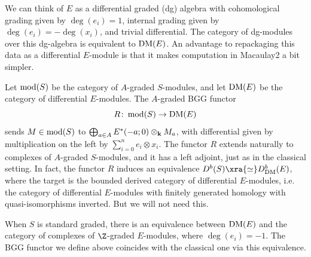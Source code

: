 \documentclass{amsart}
\begin{document}
\begin{remark}
We can think of $E$ as a differential graded (dg) algebra with cohomological grading given by $\deg(e_i) = 1$, internal grading given by $\deg(e_i) = -\deg(x_i)$, and trivial differential. The category of dg-modules over this dg-algebra is equivalent to $\operatorname{DM}(E)$. An advantage to repackaging this data as a differential $E$-module is that it makes computation in Macaulay2 a bit simpler.
\end{remark}

Let $\operatorname{mod}(S)$ be the category of $A$-graded $S$-modules, and let $\operatorname{DM}(E)$ be the category of differential $E$-modules. The $A$-graded BGG functor
$$
R \colon \operatorname{mod}(S) \to \operatorname{DM}(E)
$$
sends $M \in \operatorname{mod}(S)$ to $\bigoplus_{a \in A} E^*(-a;0) \otimes_{\mathbf{k}} M_a$, with differential given by multiplication on the left by $\sum_{i = 0}^n e_i \otimes x_i$. The functor $R$ extends naturally to complexes of $A$-graded $S$-modules, and it has a left adjoint, just as in the classical setting. In fact, the functor $R$ induces an equivalence $D^b(S) \xra{\simeq} D^b_{\DM}(E)$, where the target is the bounded derived category of differential $E$-modules, i.e. the category of differential $E$-modules with finitely generated homology with quasi-isomorphisms inverted. But we will not need this.

\begin{remark}
\label{rem:stdm}
When $S$ is standard graded, there is an equivalence between $\operatorname{DM}(E)$ and the category of complexes of $\Z$-graded $E$-modules, where $\deg(e_i) = -1$. The BGG functor we define above coincides with the classical one via this equivalence.
\end{remark}
\end{document}
